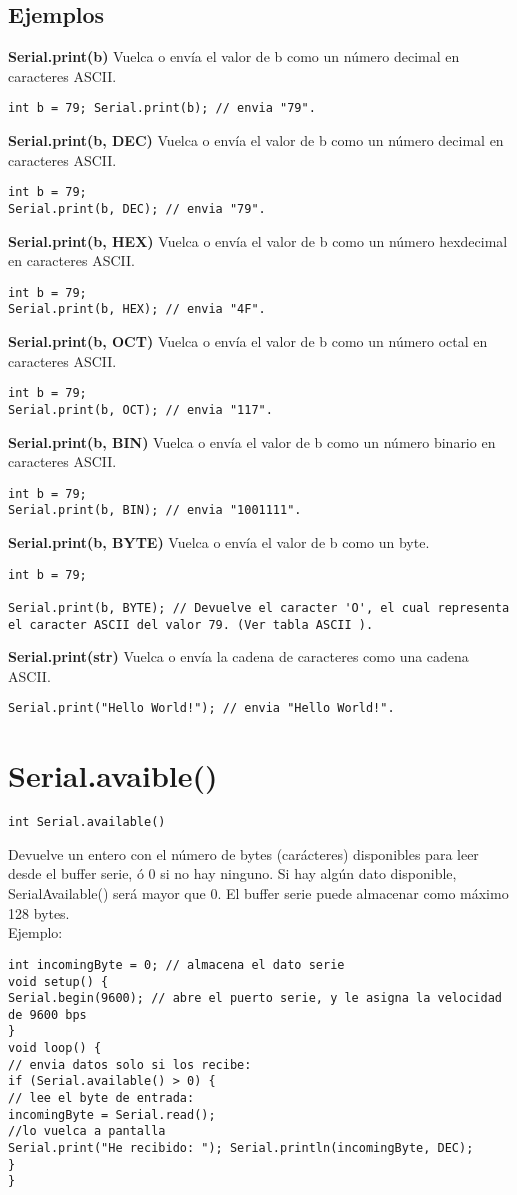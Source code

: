 \subsection{Ejemplos}
\textbf{Serial.print(b)}
Vuelca o envía el valor de b como un número decimal en caracteres ASCII.
\begin{lstlisting}
int b = 79; Serial.print(b); // envia "79".
\end{lstlisting}
\textbf{Serial.print(b, DEC)}
Vuelca o envía el valor de b como un número decimal en caracteres ASCII.
\begin{lstlisting}
int b = 79;
Serial.print(b, DEC); // envia "79".
\end{lstlisting}
\textbf{Serial.print(b, HEX)}
Vuelca o envía el valor de b como un número hexdecimal en caracteres ASCII.
\begin{lstlisting}
int b = 79;
Serial.print(b, HEX); // envia "4F".
\end{lstlisting}
\textbf{Serial.print(b, OCT)}
Vuelca o envía el valor de b como un número octal en caracteres ASCII.
\begin{lstlisting}
int b = 79;
Serial.print(b, OCT); // envia "117".
\end{lstlisting}
\newpage{}
\textbf{Serial.print(b, BIN)}
Vuelca o envía el valor de b como un número binario en caracteres ASCII.
\begin{lstlisting}
int b = 79;
Serial.print(b, BIN); // envia "1001111".
\end{lstlisting}
\textbf{Serial.print(b, BYTE)}
Vuelca o envía el valor de b como un byte.
\begin{lstlisting}
int b = 79;

Serial.print(b, BYTE); // Devuelve el caracter 'O', el cual representa el caracter ASCII del valor 79. (Ver tabla ASCII ).
\end{lstlisting}
\textbf{Serial.print(str)}
Vuelca o envía la cadena de caracteres como una cadena ASCII.
\begin{lstlisting}
Serial.print("Hello World!"); // envia "Hello World!".
\end{lstlisting}

\section{Serial.avaible()}
\begin{lstlisting}
int Serial.available()
\end{lstlisting}
Devuelve un entero con el número de bytes (carácteres) disponibles para leer desde el buffer serie, ó 0 si no hay ninguno. Si hay algún dato disponible, SerialAvailable() será mayor que 0. El buffer serie puede almacenar como máximo 128 bytes.\\
Ejemplo:
\begin{lstlisting}
int incomingByte = 0; // almacena el dato serie
void setup() {
Serial.begin(9600); // abre el puerto serie, y le asigna la velocidad de 9600 bps
}
void loop() {
// envia datos solo si los recibe:
if (Serial.available() > 0) {
// lee el byte de entrada:
incomingByte = Serial.read();
//lo vuelca a pantalla
Serial.print("He recibido: "); Serial.println(incomingByte, DEC);
}
}
\end{lstlisting}
